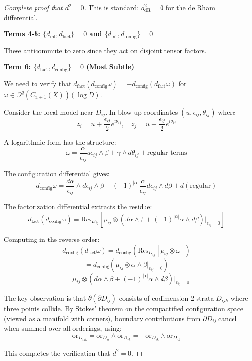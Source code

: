 \begin{proof}[Complete proof that $d^2 = 0$]
This is standard: $d_{\text{dR}}^2 = 0$ for the de Rham differential.

\textbf{Terms 4-5: $\{d_{\text{int}}, d_{\text{fact}}\} = 0$ and $\{d_{\text{int}}, d_{\text{config}}\} = 0$}

These anticommute to zero since they act on disjoint tensor factors.

\textbf{Term 6: $\{d_{\text{fact}}, d_{\text{config}}\} = 0$ (Most Subtle)}

We need to verify that $d_{\text{fact}}(d_{\text{config}}\omega) = -d_{\text{config}}(d_{\text{fact}}\omega)$ for $\omega \in \Omega^q(\overline{C}_{n+1}(X))(\log D)$.

Consider the local model near $D_{ij}$. In blow-up coordinates $(u, \epsilon_{ij}, \theta_{ij})$ where 
$$z_i = u + \frac{\epsilon_{ij}}{2}e^{i\theta_{ij}}, \quad z_j = u - \frac{\epsilon_{ij}}{2}e^{i\theta_{ij}}$$

A logarithmic form has the structure:
$$\omega = \frac{\alpha}{\epsilon_{ij}} d\epsilon_{ij} \wedge \beta + \gamma \wedge d\theta_{ij} + \text{regular terms}$$

The configuration differential gives:
$$d_{\text{config}}\omega = \frac{d\alpha}{\epsilon_{ij}} \wedge d\epsilon_{ij} \wedge \beta + (-1)^{|\alpha|}\frac{\alpha}{\epsilon_{ij}} d\epsilon_{ij} \wedge d\beta + d(\text{regular})$$

The factorization differential extracts the residue:
$$d_{\text{fact}}(d_{\text{config}}\omega) = \text{Res}_{D_{ij}}[\mu_{ij} \otimes (d\alpha \wedge \beta + (-1)^{|\alpha|}\alpha \wedge d\beta)|_{\epsilon_{ij}=0}]$$

Computing in the reverse order:
$$d_{\text{config}}(d_{\text{fact}}\omega) = d_{\text{config}}(\text{Res}_{D_{ij}}[\mu_{ij} \otimes \omega])$$
$$= d_{\text{config}}(\mu_{ij} \otimes \alpha \wedge \beta|_{\epsilon_{ij}=0})$$
$$= \mu_{ij} \otimes (d\alpha \wedge \beta + (-1)^{|\alpha|}\alpha \wedge d\beta)|_{\epsilon_{ij}=0}$$

The key observation is that $\partial(\partial D_{ij})$ consists of codimension-2 strata $D_{ijk}$ where three points collide. By Stokes' theorem on the compactified configuration space (viewed as a manifold with corners), boundary contributions from $\partial D_{ij}$ cancel when summed over all orderings, using:
$$\text{or}_{D_{ijk}} = \text{or}_{D_{ij}} \wedge \text{or}_{D_{jk}} = -\text{or}_{D_{ik}} \wedge \text{or}_{D_{jk}}$$

This completes the verification that $d^2 = 0$.
\end{proof}


